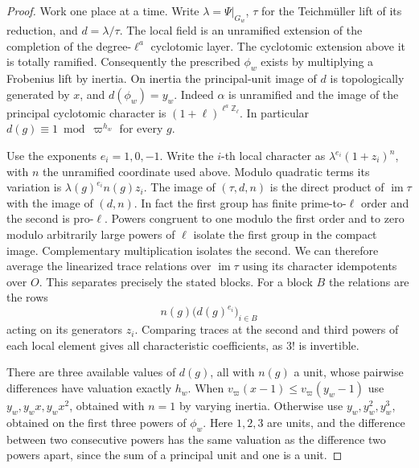 \documentclass[a4paper,11pt]{article}
\theoremstyle{definition}
\theoremstyle{remark}
\newcommand{\ZZ}{\mathbb Z}\newcommand{\ord}{\operatorname{ord}}
\numberwithin{equation}{section}
\begin{document}
\begin{proof}
Work one place at a time. Write \(\lambda=\Psi|_{G_w}\),
\(\tau\) for the Teichm\"uller lift of its reduction, and
\(d=\lambda/\tau\). The local field is an unramified extension
of the completion of the degree-\(\ell^a\) cyclotomic layer.
The cyclotomic extension above it is totally ramified.
Consequently the prescribed \(\phi_w\) exists by multiplying
a Frobenius lift by inertia. On inertia the principal-unit
image of \(d\) is topologically generated by \(x\), and
\(d(\phi_w)=y_w\). Indeed \(\alpha\) is unramified and
the image of the principal cyclotomic character is
\((1+\ell)^{\ell^a\ZZ_\ell}\). In particular
\(d(g)\equiv1\bmod\varpi^{h_w}\) for every \(g\).

Use the exponents \(e_i=1,0,-1\). Write the \(i\)-th
local character as \(\lambda^{e_i}(1+z_i)^n\), with \(n\)
the unramified coordinate used above. Modulo quadratic terms
its variation is \(\lambda(g)^{e_i}n(g)z_i\).
The image of \((\tau,d,n)\) is the direct product of
\(\operatorname{im}\tau\) with the image of \((d,n)\).
In fact the first group has finite prime-to-\(\ell\) order
and the second is pro-\(\ell\). Powers congruent to one
modulo the first order and to zero modulo arbitrarily large
powers of \(\ell\) isolate the first group in the compact
image. Complementary multiplication isolates the second.
We can therefore average the linearized trace relations
over \(\operatorname{im}\tau\) using its character idempotents
over \(O\). This separates precisely the stated blocks.
For a block \(B\) the relations are the rows
\[
              n(g)\bigl(d(g)^{e_i}\bigr)_{i\in B}
\]
acting on its generators \(z_i\). Comparing traces at the
second and third powers of each local element gives all
characteristic coefficients, as \(3!\) is invertible.

There are three available values of \(d(g)\), all with
\(n(g)\) a unit, whose pairwise differences have valuation
exactly \(h_w\). When \(v_\varpi(x-1)\le v_\varpi(y_w-1)\)
use \(y_w,y_w x,y_w x^2\), obtained with \(n=1\) by varying
inertia. Otherwise use \(y_w,y_w^2,y_w^3\), obtained on
the first three powers of \(\phi_w\). Here \(1,2,3\) are
units, and the difference between two consecutive powers
has the same valuation as the difference two powers apart,
since the sum of a principal unit and one is a unit.


\end{proof}
\end{document}
